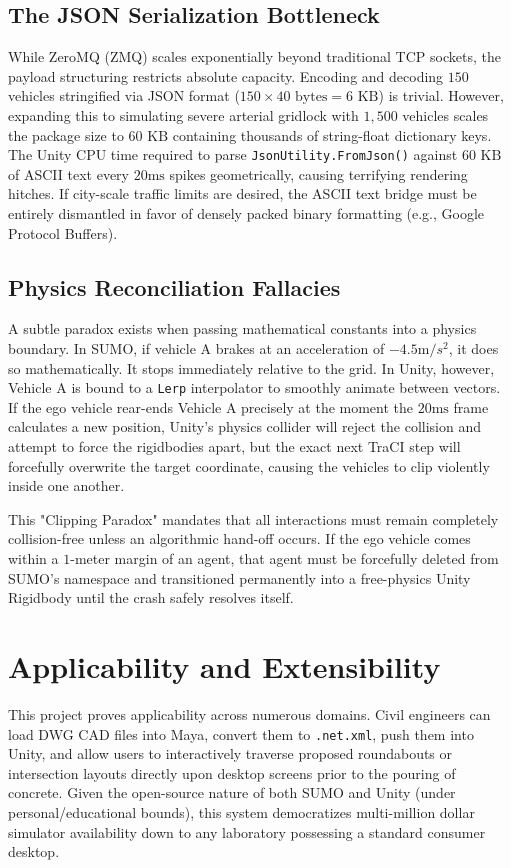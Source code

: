 \subsection{The JSON Serialization Bottleneck}
While ZeroMQ (ZMQ) scales exponentially beyond traditional TCP sockets, the payload structuring restricts absolute capacity. Encoding and decoding $150$ vehicles stringified via JSON format ($150 \times 40 \text{ bytes} = 6 \text{ KB}$) is trivial. However, expanding this to simulating severe arterial gridlock with $1,500$ vehicles scales the package size to $60 \text{ KB}$ containing thousands of string-float dictionary keys. The Unity CPU time required to parse \texttt{JsonUtility.FromJson()} against $60 \text{ KB}$ of ASCII text every $20\text{ms}$ spikes geometrically, causing terrifying rendering hitches. If city-scale traffic limits are desired, the ASCII text bridge must be entirely dismantled in favor of densely packed binary formatting (e.g., Google Protocol Buffers).

\subsection{Physics Reconciliation Fallacies}
A subtle paradox exists when passing mathematical constants into a physics boundary. In SUMO, if vehicle A brakes at an acceleration of $-4.5 \text{m}/s^2$, it does so mathematically. It stops immediately relative to the grid. In Unity, however, Vehicle A is bound to a \texttt{Lerp} interpolator to smoothly animate between vectors. If the ego vehicle rear-ends Vehicle A precisely at the moment the $20\text{ms}$ frame calculates a new position, Unity's physics collider will reject the collision and attempt to force the rigidbodies apart, but the exact next TraCI step will forcefully overwrite the target coordinate, causing the vehicles to clip violently inside one another.

This "Clipping Paradox" mandates that all interactions must remain completely collision-free unless an algorithmic hand-off occurs. If the ego vehicle comes within a $1$-meter margin of an agent, that agent must be forcefully deleted from SUMO's namespace and transitioned permanently into a free-physics Unity Rigidbody until the crash safely resolves itself.

\section{Applicability and Extensibility}

This project proves applicability across numerous domains. Civil engineers can load DWG CAD files into Maya, convert them to \texttt{.net.xml}, push them into Unity, and allow users to interactively traverse proposed roundabouts or intersection layouts directly upon desktop screens prior to the pouring of concrete. Given the open-source nature of both SUMO and Unity (under personal/educational bounds), this system democratizes multi-million dollar simulator availability down to any laboratory possessing a standard consumer desktop.
